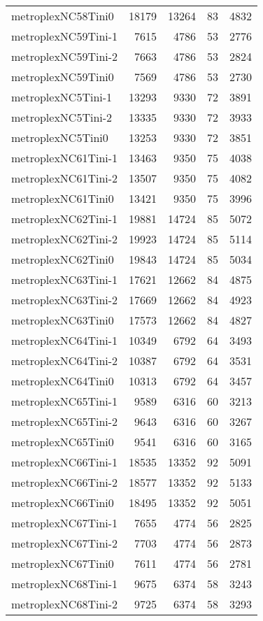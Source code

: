 \begin{longtable}{lrrrr}
metroplexNC58Tini0 & 18179 & 13264 & 83 & 4832 \\
metroplexNC59Tini-1 & 7615 & 4786 & 53 & 2776 \\
metroplexNC59Tini-2 & 7663 & 4786 & 53 & 2824 \\
metroplexNC59Tini0 & 7569 & 4786 & 53 & 2730 \\
metroplexNC5Tini-1 & 13293 & 9330 & 72 & 3891 \\
metroplexNC5Tini-2 & 13335 & 9330 & 72 & 3933 \\
metroplexNC5Tini0 & 13253 & 9330 & 72 & 3851 \\
metroplexNC61Tini-1 & 13463 & 9350 & 75 & 4038 \\
metroplexNC61Tini-2 & 13507 & 9350 & 75 & 4082 \\
metroplexNC61Tini0 & 13421 & 9350 & 75 & 3996 \\
metroplexNC62Tini-1 & 19881 & 14724 & 85 & 5072 \\
metroplexNC62Tini-2 & 19923 & 14724 & 85 & 5114 \\
metroplexNC62Tini0 & 19843 & 14724 & 85 & 5034 \\
metroplexNC63Tini-1 & 17621 & 12662 & 84 & 4875 \\
metroplexNC63Tini-2 & 17669 & 12662 & 84 & 4923 \\
metroplexNC63Tini0 & 17573 & 12662 & 84 & 4827 \\
metroplexNC64Tini-1 & 10349 & 6792 & 64 & 3493 \\
metroplexNC64Tini-2 & 10387 & 6792 & 64 & 3531 \\
metroplexNC64Tini0 & 10313 & 6792 & 64 & 3457 \\
metroplexNC65Tini-1 & 9589 & 6316 & 60 & 3213 \\
metroplexNC65Tini-2 & 9643 & 6316 & 60 & 3267 \\
metroplexNC65Tini0 & 9541 & 6316 & 60 & 3165 \\
metroplexNC66Tini-1 & 18535 & 13352 & 92 & 5091 \\
metroplexNC66Tini-2 & 18577 & 13352 & 92 & 5133 \\
metroplexNC66Tini0 & 18495 & 13352 & 92 & 5051 \\
metroplexNC67Tini-1 & 7655 & 4774 & 56 & 2825 \\
metroplexNC67Tini-2 & 7703 & 4774 & 56 & 2873 \\
metroplexNC67Tini0 & 7611 & 4774 & 56 & 2781 \\
metroplexNC68Tini-1 & 9675 & 6374 & 58 & 3243 \\
metroplexNC68Tini-2 & 9725 & 6374 & 58 & 3293 \\

\end{longtable}
